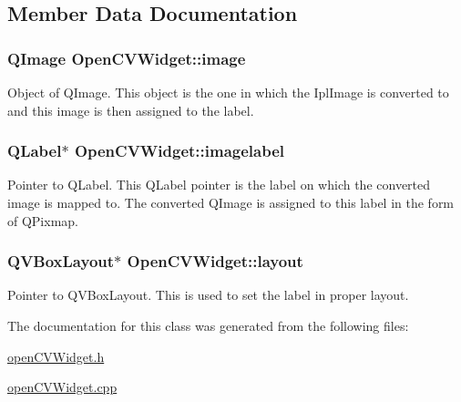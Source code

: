 \subsection{Member Data Documentation}
\hypertarget{classOpenCVWidget_a943bdf3d872bc531e759f210f301f1f9}{
\subsubsection[{image}]{\setlength{\rightskip}{0pt plus 5cm}QImage {\bf OpenCVWidget::image}}}
\label{classOpenCVWidget_a943bdf3d872bc531e759f210f301f1f9}
Object of QImage. This object is the one in which the IplImage is converted to and this image is then assigned to the label. \hypertarget{classOpenCVWidget_afee1a5f25e6e5072aad2cffdc155a3a0}{
\subsubsection[{imagelabel}]{\setlength{\rightskip}{0pt plus 5cm}QLabel$\ast$ {\bf OpenCVWidget::imagelabel}}}
\label{classOpenCVWidget_afee1a5f25e6e5072aad2cffdc155a3a0}
Pointer to QLabel. This QLabel pointer is the label on which the converted image is mapped to. The converted QImage is assigned to this label in the form of QPixmap. \hypertarget{classOpenCVWidget_afc95cfbd7dc35fe7d1ddb7aeceb0d6ae}{
\subsubsection[{layout}]{\setlength{\rightskip}{0pt plus 5cm}QVBoxLayout$\ast$ {\bf OpenCVWidget::layout}}}
\label{classOpenCVWidget_afc95cfbd7dc35fe7d1ddb7aeceb0d6ae}
Pointer to QVBoxLayout. This is used to set the label in proper layout. 

The documentation for this class was generated from the following files:\begin{DoxyCompactItemize}
\item 
\hyperlink{openCVWidget_8h}{openCVWidget.h}\item 
\hyperlink{openCVWidget_8cpp}{openCVWidget.cpp}\end{DoxyCompactItemize}
